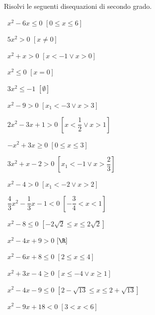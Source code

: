 \begin{esercizio}[\Ast]
 \label{ese:4.1}
Risolvi le seguenti disequazioni di secondo grado.
\vspace{\dy}
\begin{multicols}{2}
 \begin{enumeratea}
 \item~\(x^2-6x\le 0\) \hfill \(\left[0\le x\le 6\right]\)
 \item~\(5x^2>0\) \hfill \(\left[x\neq 0\right]\)
 \item~\(x^2+x>0\) \hfill \(\left[x<-1\vee x>0\right]\)
 \item~\(x^2\le 0\) \hfill \(\left[x=0\right]\)
 \item~\(3x^2\le -1\) \hfill \(\left[\emptyset \right]\)
 \item~\(x^2-9>0\) \hfill \(\left[x_1<-3\vee x>3\right]\)
 \item~\(2x^2-3x+1>0\) \hfill \(\left[x<\dfrac 1 2\vee x>1\right]\)
 \item~\(-x^2+3x\ge 0\) \hfill \(\left[0\le x\le 3\right]\)
 \item~\(3x^2+x-2>0\) \hfill \(\left[x_1<-1\vee x>\dfrac 2 3\right]\)
 \item~\(x^2-4>0\) \hfill \(\left[x_1<-2\vee x>2\right]\)
 \item~\(\dfrac 4 3x^2-\dfrac 1 3x-1<0\) \hfill \(\left[-\dfrac 3 
4<x<1\right]\)
 \item~\(x^2-8\le 0\) \hfill \(\left[-2\sqrt 2\le x\le 2\sqrt 2\right]\)
 \item~\(x^2-4x+9>0\) \hfill \(\left[\R\right]\)
 \item~\(x^2-6x+8\le 0\) \hfill \(\left[2\le x\le 4\right]\)
 \item~\(x^2+3x-4\ge 0\) \hfill \(\left[x\le -4\vee x\ge 1\right]\)
 \item~\(x^2-4x-9\le 0\) \hfill \(\left[2-\sqrt{13}\le x\le 
2+\sqrt{13}\right]\)
 \item~\(x^2-9x+18<0\) \hfill \(\left[3<x<6\right]\)
 \end{enumeratea}
 \end{multicols}
\end{esercizio}

